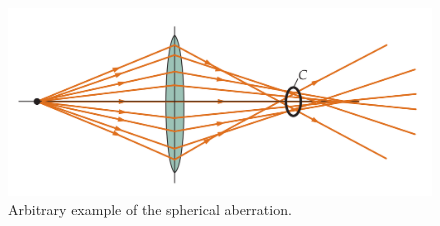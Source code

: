 \begin{figure}[htb]
	\centering
	\caption{\label{fig:spherical_aberrations} Arbitrary example of the spherical aberration.}
	\begin{center}
	    \includegraphics[scale=0.3]{images/spherical_aberration.png}
	\end{center}
	\centering
\end{figure}